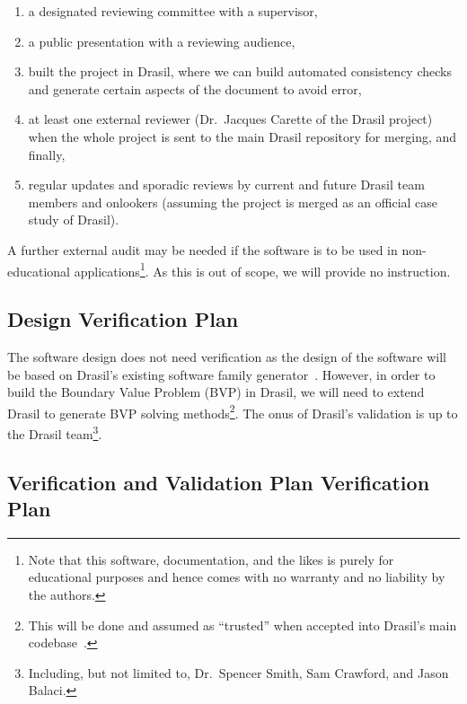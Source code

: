 \documentclass[12pt, titlepage]{article}
\begin{document}
\begin{enumerate}

    \item a designated reviewing committee with a supervisor,

    \item a public presentation with a reviewing audience,

    \item built the project in Drasil, where we can build automated consistency
          checks and generate certain aspects of the document to avoid error,

    \item at least one external reviewer (Dr.\ Jacques Carette of the Drasil
          project) when the whole \progname{} project is sent to the main Drasil
          repository for merging, and finally,

    \item regular updates and sporadic reviews by current and future Drasil team
          members and onlookers (assuming the project is merged as an official
          case study of Drasil).

\end{enumerate}

A further external audit may be needed if the software is to be used in
non-educational applications\footnote{Note that this software, documentation,
and the likes is purely for educational purposes and hence comes with no
warranty and no liability by the authors.}. As this is out of scope, we will
provide no instruction.

\subsection{Design Verification Plan}

The software design does not need verification as the design of the software
will be based on Drasil's existing software family generator~\cite{Drasil2023}.
However, in order to build the Boundary Value Problem (BVP) in Drasil, we will
need to extend Drasil to generate BVP solving methods\footnote{This will be done
    and assumed as ``trusted'' when accepted into Drasil's main
    codebase~\cite{Drasil2023}.}. The onus of Drasil's validation is up to the
Drasil team\footnote{Including, but not limited to, Dr.\ Spencer Smith, Sam
    Crawford, and Jason Balaci.}.

\subsection{Verification and Validation Plan Verification Plan}
\end{document}
